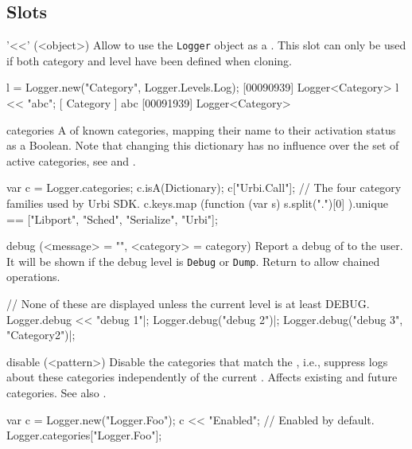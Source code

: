 \subsection{Slots}

\begin{urbiscriptapi}
\item['<<'](<object>)%
  Allow to use the \lstinline|Logger| object as a . This
  slot can only be used if both category and level have been defined when
  cloning.

\begin{urbiscript}
l = Logger.new("Category", Logger.Levels.Log);
[00090939] Logger<Category>
l << "abc";
[       Category        ] abc
[00091939] Logger<Category>
\end{urbiscript}


\item[categories]%
  A  of known categories, mapping their name to their
  activation status as a Boolean.  Note that changing this dictionary has no
  influence over the set of active categories, see  and
  .
\begin{urbiassert}[firstnumber=1]
var c = Logger.categories;
c.isA(Dictionary);
c["Urbi.Call"];
// The four category families used by Urbi SDK.
c.keys.map (function (var s) { s.split(".")[0] }).unique
  == ["Libport", "Sched", "Serialize", "Urbi"];
\end{urbiassert}


\item[debug](<message> = "", <category> = category)%
  Report a debug  of  to the user. It will be
  shown if the debug level is \lstinline|Debug| or \lstinline|Dump|. Return
  \this to allow chained operations.
\begin{urbiscript}
// None of these are displayed unless the current level is at least DEBUG.
Logger.debug << "debug 1"|;
Logger.debug("debug 2")|;
Logger.debug("debug 3", "Category2")|;
\end{urbiscript}


\item[disable](<pattern>)%
  Disable the categories that match the , i.e., suppress logs
  about these categories independently of the current .
  Affects existing and future categories.  See also .
\begin{urbiassert}
var c = Logger.new("Logger.Foo");
c << "Enabled";
// Enabled by default.
Logger.categories["Logger.Foo"];


\end{urbiassert}
\end{urbiscriptapi}
